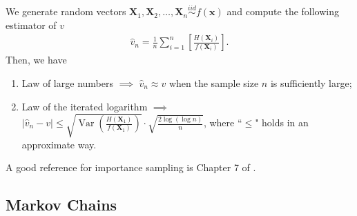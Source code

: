 \documentclass[11pt,letterpaper, leqno]{article}
\numberwithin{equation}{section}
\numberwithin{theorem}{section}
\numberwithin{lemma}{section}
\numberwithin{corollary}{section}
\numberwithin{definition}{section}
\numberwithin{proposition}{section}
\numberwithin{remark}{section}
\numberwithin{example}{section}
\begin{document}
We generate random vectors $\boldsymbol{X}_1, \boldsymbol{X}_2,\ldots, \boldsymbol{X}_n \overset{iid}{\sim} f(\boldsymbol{x})$ and compute the following estimator of $v$
\begin{align}\label{eq: importance sampling estimator}
    \boxed{ \widehat{v}_n=\frac{1}{n}\sum_{i=1}^n \left[\frac{H(\boldsymbol{X}_i)}{f(\boldsymbol{X}_i)}\right]. }
\end{align}
Then, we have
\begin{enumerate}
    \item Law of large numbers $\implies$ $\widehat{v}_n\approx v$ when the sample size $n$ is sufficiently large;
    
    \item Law of the iterated logarithm $\implies$ $\vert \widehat{v}_n - v \vert \le \sqrt{\operatorname{Var}\left(\frac{H(\boldsymbol{X}_1)}{f(\boldsymbol{X}_1)}\right)} \cdot \sqrt{\frac{2\log(\log n)}{n}}$, where ``$\le$" holds in an approximate way. 
\end{enumerate}

A good reference for importance sampling is Chapter 7 of \cite{wang2012monte}.


\subsection{Markov Chains}
\end{document}
